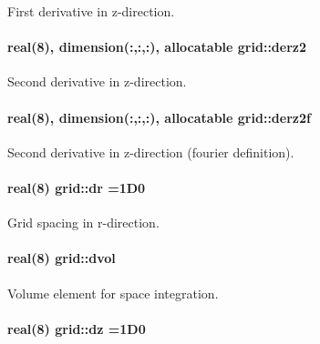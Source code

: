 First derivative in z-\/direction. 

\paragraph[{\texorpdfstring{derz2}{derz2}}]{\setlength{\rightskip}{0pt plus 5cm}real(8), dimension(\+:,\+:,\+:), allocatable grid\+::derz2}\hypertarget{namespacegrid_a524a0741df0c2d7298368fad8a95f621}{}\label{namespacegrid_a524a0741df0c2d7298368fad8a95f621}


Second derivative in z-\/direction. 

\paragraph[{\texorpdfstring{derz2f}{derz2f}}]{\setlength{\rightskip}{0pt plus 5cm}real(8), dimension(\+:,\+:,\+:), allocatable grid\+::derz2f}\hypertarget{namespacegrid_a5a54381288367b46b4e714d245b33573}{}\label{namespacegrid_a5a54381288367b46b4e714d245b33573}


Second derivative in z-\/direction (fourier definition). 

\paragraph[{\texorpdfstring{dr}{dr}}]{\setlength{\rightskip}{0pt plus 5cm}real(8) grid\+::dr =1\+D0}\hypertarget{namespacegrid_a1baa9e0cda2fabdcf3c692417f51cb99}{}\label{namespacegrid_a1baa9e0cda2fabdcf3c692417f51cb99}


Grid spacing in r-\/direction. 

\paragraph[{\texorpdfstring{dvol}{dvol}}]{\setlength{\rightskip}{0pt plus 5cm}real(8) grid\+::dvol}\hypertarget{namespacegrid_a45853148f801057061a76070e2969573}{}\label{namespacegrid_a45853148f801057061a76070e2969573}


Volume element for space integration. 

\paragraph[{\texorpdfstring{dz}{dz}}]{\setlength{\rightskip}{0pt plus 5cm}real(8) grid\+::dz =1\+D0}\hypertarget{namespacegrid_af2dd57b4230bb5691266889f867fc507}{}\label{namespacegrid_af2dd57b4230bb5691266889f867fc507}


